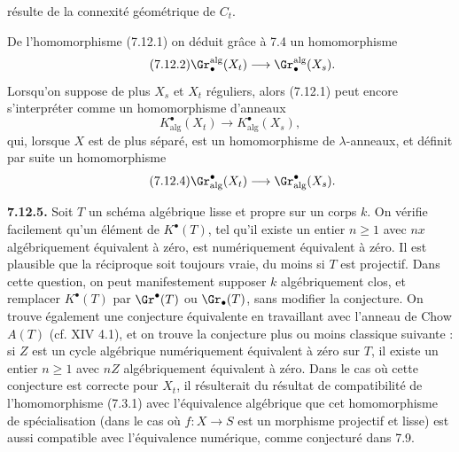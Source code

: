 résulte de la connexité géométrique de \(C_t\).

De l'homomorphisme (7.12.1) on déduit grâce à 7.4 un homomorphisme
\begin{equation}\tag{7.12.2}
  \Gr_\bullet^{\mathrm{alg}}(X_t)\longrightarrow \Gr_\bullet^{\mathrm{alg}}(X_s).
\end{equation}
Lorsqu'on suppose de plus \(X_s\) et \(X_t\) réguliers, alors (7.12.1) peut encore s'interpréter comme un homomorphisme d'anneaux
\begin{equation}\tag{7.12.3}
  K^\bullet_{\mathrm{alg}}(X_t)\longrightarrow K^\bullet_{\mathrm{alg}}(X_s),
\end{equation}
qui, lorsque \(X\) est de plus séparé, est un homomorphisme de \(\lambda\)-anneaux, et définit par suite un homomorphisme
\begin{equation}\tag{7.12.4}
  \Gr^\bullet_{\mathrm{alg}}(X_t)\longrightarrow \Gr^\bullet_{\mathrm{alg}}(X_s).
\end{equation}

\textbf{7.12.5.} Soit \(T\) un schéma algébrique lisse et propre sur un corps \(k\). On vérifie facilement qu'un élément de \(K^\bullet(T)\), tel qu'il existe un entier \(n\geq1\) avec \(nx\) algébriquement équivalent à zéro, est numériquement équivalent à zéro. Il est plausible que la réciproque soit toujours vraie, du moins si \(T\) est projectif. Dans cette question, on peut manifestement supposer \(k\) algébriquement clos, et remplacer \(K^\bullet(T)\) par \(\Gr^\bullet(T)\) ou \(\Gr_\bullet(T)\), sans modifier la conjecture. On trouve également une conjecture équivalente en travaillant avec l'anneau de Chow \(A(T)\) (cf. XIV 4.1), et on trouve la conjecture plus ou moins classique suivante : si \(Z\) est un cycle algébrique numériquement équivalent à zéro sur \(T\), il existe un entier \(n\geq1\) avec \(nZ\) algébriquement équivalent à zéro. Dans le cas où cette conjecture est correcte pour \(X_t\), il résulterait du résultat de compatibilité de l'homomorphisme (7.3.1) avec l'équivalence algébrique que cet homomorphisme de spécialisation (dans le cas où \(f:X\to S\) est un morphisme projectif et lisse) est aussi compatible avec l'équivalence numérique, comme conjecturé dans 7.9.

